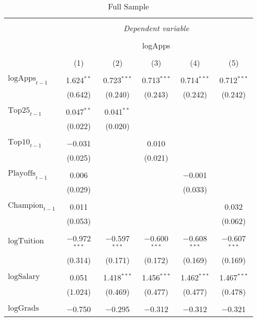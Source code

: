 \documentclass[12pt,english]{article}
\begin{document}
\begin{table} \centering 
  \caption{Full Sample} 
  \label{} 
\begin{tabular}{@{\extracolsep{5pt}}lccccc} 
\\[-1.8ex]\hline 
\hline \\[-1.8ex] 
 & \multicolumn{5}{c}{\textit{Dependent variable}} \\ 
\cline{2-6} 
\\[-1.8ex] & \multicolumn{5}{c}{logApps} \\ 
\\[-1.8ex] & (1) & (2) & (3) & (4) & (5)\\ 
\hline \\[-1.8ex] 
 $\text{logApps}_{t-1}$ & 1.624$^{**}$ & 0.723$^{***}$ & 0.713$^{***}$ & 0.714$^{***}$ & 0.712$^{***}$ \\ 
  & (0.642) & (0.240) & (0.243) & (0.242) & (0.242) \\ 
  & & & & & \\ 
 $\text{Top25}_{t-1}$ & 0.047$^{**}$ & 0.041$^{**}$ &  &  &  \\ 
  & (0.022) & (0.020) &  &  &  \\ 
  & & & & & \\ 
 $\text{Top10}_{t-1}$ & $-$0.031 &  & 0.010 &  &  \\ 
  & (0.025) &  & (0.021) &  &  \\ 
  & & & & & \\ 
 $\text{Playoffs}_{t-1}$ & 0.006 &  &  & $-$0.001 &  \\ 
  & (0.029) &  &  & (0.033) &  \\ 
  & & & & & \\ 
 $\text{Champion}_{t-1}$ & 0.011 &  &  &  & 0.032 \\ 
  & (0.053) &  &  &  & (0.062) \\ 
  & & & & & \\ 
 $\text{logTuition}$ & $-$0.972$^{***}$ & $-$0.597$^{***}$ & $-$0.600$^{***}$ & $-$0.608$^{***}$ & $-$0.607$^{***}$ \\ 
  & (0.314) & (0.171) & (0.172) & (0.169) & (0.169) \\ 
  & & & & & \\ 
 $\text{logSalary}$ & 0.051 & 1.418$^{***}$ & 1.456$^{***}$ & 1.462$^{***}$ & 1.467$^{***}$ \\ 
  & (1.024) & (0.469) & (0.477) & (0.477) & (0.478) \\ 
  & & & & & \\ 
 $\text{logGrads}$ & $-$0.750 & $-$0.295 & $-$0.312 & $-$0.312 & $-$0.321 \\ 

\end{tabular}
\end{table}
\end{document}
